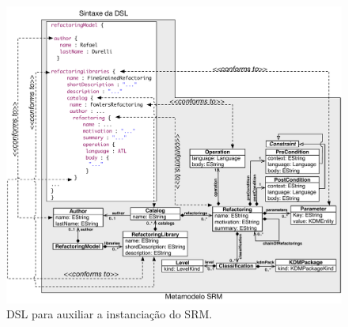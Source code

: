 
\begin{figure}[!h]
	\centering
	\caption{DSL para auxiliar a instanciação do SRM.}
	\label{fig:DSL_SRM}
	\includegraphics[scale=0.6]{images/MetaModelEDSL2}
	\fautor
\end{figure}

